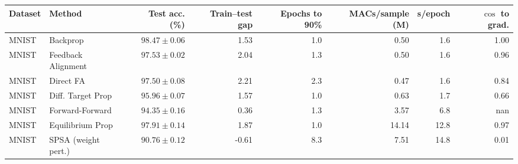 \begin{tabular}{llrrrrrr}\toprule
Dataset & Method & Test acc. (\%) & Train--test gap & Epochs to 90\% & MACs/sample (M) & s/epoch & $\cos$ to grad.\\\midrule
MNIST & Backprop & $98.47\pm0.06$ & 1.53 & 1.0 & 0.50 & 1.6 & 1.00\\
MNIST & Feedback Alignment & $97.53\pm0.02$ & 2.04 & 1.3 & 0.50 & 1.6 & 0.96\\
MNIST & Direct FA & $97.50\pm0.08$ & 2.21 & 2.3 & 0.47 & 1.6 & 0.84\\
MNIST & Diff. Target Prop & $95.96\pm0.07$ & 1.57 & 1.0 & 0.63 & 1.7 & 0.66\\
MNIST & Forward-Forward & $94.35\pm0.16$ & 0.36 & 1.3 & 3.57 & 6.8 & nan\\
MNIST & Equilibrium Prop & $97.91\pm0.14$ & 1.87 & 1.0 & 14.14 & 12.8 & 0.97\\
MNIST & SPSA (weight pert.) & $90.76\pm0.12$ & -0.61 & 8.3 & 7.51 & 14.8 & 0.01\\
\bottomrule\end{tabular}
